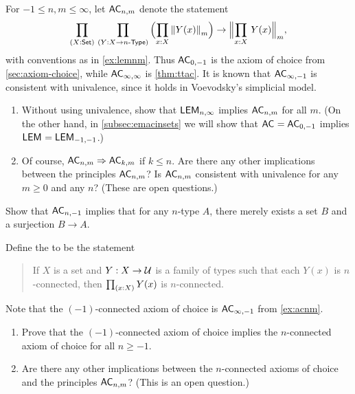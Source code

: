 \begin{ex}\label{ex:acnm}
  For $-1\le n,m\le\infty$, let $\mathsf{AC}_{n,m}$ denote the statement
  \[ \prd{X:\set}{Y:X\to\ntype{n}}
  \Parens{\prd{x:X} \trunc m{Y(x)}}
  \to
  \Trunc m{\prd{x:X} Y(x)},
  \]
  with conventions as in \cref{ex:lemnm}.
  Thus $\mathsf{AC}_{0,-1}$ is the axiom of choice from \cref{sec:axiom-choice}, while $\mathsf{AC}_{\infty,\infty}$ is \cref{thm:ttac}.
  It is known that $\mathsf{AC}_{\infty,-1}$ is consistent with univalence, since it holds in Voevodsky's simplicial model.
  \begin{enumerate}
  \item Without using univalence, show that $\mathsf{LEM}_{n,\infty}$ implies $\mathsf{AC}_{n,m}$ for all $m$.
    (On the other hand, in \cref{subsec:emacinsets} we will show that $\mathsf{AC}_{}=\mathsf{AC}_{0,-1}$ implies $\mathsf{LEM}_{}=\mathsf{LEM}_{-1,-1}$.)
  \item Of course, $\mathsf{AC}_{n,m}\Rightarrow \mathsf{AC}_{k,m}$ if $k\le n$.
    Are there any other implications between the principles $\mathsf{AC}_{n,m}$?
    Is $\mathsf{AC}_{n,m}$ consistent with univalence for any $m\ge 0$ and any $n$?
    (These are open questions.)
  \end{enumerate}
\end{ex}

\begin{ex}\label{ex:acnm-surjset}
  Show that $\mathsf{AC}_{n,-1}$ implies that for any $n$-type $A$, there merely exists a set $B$ and a surjection $B\to A$.
\end{ex}

\begin{ex}\label{ex:acconn}
  Define the 
  to be the statement
  \begin{quote}
    If $X$ is a set and $Y:X\to \mathcal{U}$ is a family of types such that each $Y(x)$ is $n$-connected, then $\prd{x:X} Y(x)$ is $n$-connected.
  \end{quote}
  Note that the $(-1)$-connected axiom of choice is $\mathsf{AC}_{\infty,-1}$ from \cref{ex:acnm}.
  \begin{enumerate}
  \item Prove that the $(-1)$-connected axiom of choice implies the $n$-con\-nect\-ed axiom of choice for all $n\ge -1$.
  \item Are there any other implications between the $n$-connected axioms of choice and the principles $\mathsf{AC}_{n,m}$?
    (This is an open question.)
  \end{enumerate}
\end{ex}

